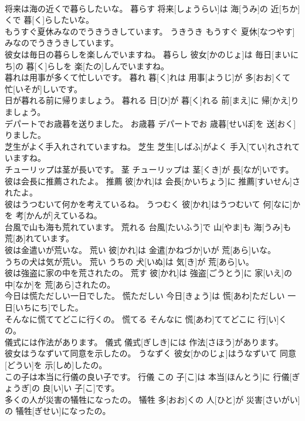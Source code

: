\documentclass[8pt]{extreport}
\begin{document}
\begin{CJK}{UTF8}{min}
\\	将来は海の近くで暮らしたいな。	暮らす	将来[しょうらい]は 海[うみ]の 近[ちか]くで 暮[く]らしたいな。	
\\	もうすぐ夏休みなのでうきうきしています。	うきうき	もうすぐ 夏休[なつやす]みなのでうきうきしています。	
\\	彼女は毎日の暮らしを楽しんでいますね。	暮らし	彼女[かのじょ]は 毎日[まいにち]の 暮[く]らしを 楽[たの]しんでいますね。	
\\	暮れは用事が多くて忙しいです。	暮れ	暮[く]れは 用事[ようじ]が 多[おお]くて 忙[いそが]しいです。	
\\	日が暮れる前に帰りましょう。	暮れる	日[ひ]が 暮[く]れる 前[まえ]に 帰[かえ]りましょう。	
\\	デパートでお歳暮を送りました。	お歳暮	デパートでお 歳暮[せいぼ]を 送[おく]りました。	
\\	芝生がよく手入れされていますね。	芝生	芝生[しばふ]がよく 手入[てい]れされていますね。	
\\	チューリップは茎が長いです。	茎	チューリップは 茎[くき]が 長[なが]いです。	
\\	彼は会長に推薦されたよ。	推薦	彼[かれ]は 会長[かいちょう]に 推薦[すいせん]されたよ。	
\\	彼はうつむいて何かを考えているね。	うつむく	彼[かれ]はうつむいて 何[なに]かを 考[かんが]えているね。	
\\	台風で山も海も荒れています。	荒れる	台風[たいふう]で 山[やま]も 海[うみ]も 荒[あ]れています。	
\\	彼は金遣いが荒いな。	荒い	彼[かれ]は 金遣[かねづか]いが 荒[あら]いな。	
\\	うちの犬は気が荒い。	荒い	うちの 犬[いぬ]は 気[き]が 荒[あら]い。	
\\	彼は強盗に家の中を荒されたの。	荒す	彼[かれ]は 強盗[ごうとう]に 家[いえ]の 中[なか]を 荒[あら]されたの。	
\\	今日は慌ただしい一日でした。	慌ただしい	今日[きょう]は 慌[あわ]ただしい 一日[いちにち]でした。	
\\	そんなに慌ててどこに行くの。	慌てる	そんなに 慌[あわ]ててどこに 行[い]くの。	
\\	儀式には作法があります。	儀式	儀式[ぎしき]には 作法[さほう]があります。	
\\	彼女はうなずいて同意を示したの。	うなずく	彼女[かのじょ]はうなずいて 同意[どうい]を 示[しめ]したの。	
\\	この子は本当に行儀の良い子です。	行儀	この 子[こ]は 本当[ほんとう]に 行儀[ぎょうぎ]の 良[い]い 子[こ]です。	
\\	多くの人が災害の犠牲になったの。	犠牲	多[おお]くの 人[ひと]が 災害[さいがい]の 犠牲[ぎせい]になったの。	

\end{CJK}
\end{document}
